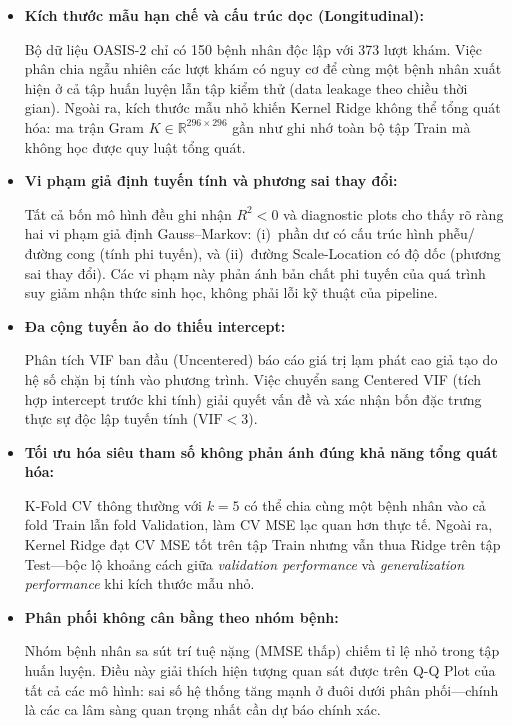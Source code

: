 \begin{itemize}
  \item \textbf{Kích thước mẫu hạn chế và cấu trúc dọc (Longitudinal):}

        Bộ dữ liệu OASIS-2 chỉ có 150 bệnh nhân độc lập với 373 lượt khám.
        Việc phân chia ngẫu nhiên các lượt khám có nguy cơ để cùng một bệnh
        nhân xuất hiện ở cả tập huấn luyện lẫn tập kiểm thử (data leakage
        theo chiều thời gian). Ngoài ra, kích thước mẫu nhỏ khiến Kernel Ridge
        không thể tổng quát hóa: ma trận Gram $K \in \mathbb{R}^{296 \times
        296}$ gần như ghi nhớ toàn bộ tập Train mà không học được quy luật
        tổng quát.
 
  \item \textbf{Vi phạm giả định tuyến tính và phương sai thay đổi:}

        Tất cả bốn mô hình đều ghi nhận $R^2 < 0$ và diagnostic plots cho thấy
        rõ ràng hai vi phạm giả định Gauss--Markov: (i)~phần dư có cấu trúc
        hình phễu/đường cong (tính phi tuyến), và (ii)~đường Scale-Location có
        độ dốc (phương sai thay đổi). Các vi phạm này phản ánh bản chất phi
        tuyến của quá trình suy giảm nhận thức sinh học, không phải lỗi kỹ
        thuật của pipeline.
 
  \item \textbf{Đa cộng tuyến ảo do thiếu intercept:}

        Phân tích VIF ban đầu (Uncentered) báo cáo giá trị lạm phát cao giả tạo
        do hệ số chặn bị tính vào phương trình. Việc chuyển sang Centered VIF
        (tích hợp intercept trước khi tính) giải quyết vấn đề và xác nhận bốn
        đặc trưng thực sự độc lập tuyến tính (\(\text{VIF} < 3\)).
 
  \item \textbf{Tối ưu hóa siêu tham số không phản ánh đúng khả năng tổng
        quát hóa:}

        K-Fold CV thông thường với \(k = 5\) có thể chia cùng một bệnh nhân vào
        cả fold Train lẫn fold Validation, làm CV MSE lạc quan hơn thực tế.
        Ngoài ra, Kernel Ridge đạt CV MSE tốt trên tập Train nhưng vẫn thua
        Ridge trên tập Test—bộc lộ khoảng cách giữa \emph{validation
        performance} và \emph{generalization performance} khi kích thước mẫu
        nhỏ.
 
  \item \textbf{Phân phối không cân bằng theo nhóm bệnh:}

        Nhóm bệnh nhân sa sút trí tuệ nặng (MMSE thấp) chiếm tỉ lệ nhỏ trong
        tập huấn luyện. Điều này giải thích hiện tượng quan sát được trên Q-Q
        Plot của tất cả các mô hình: sai số hệ thống tăng mạnh ở đuôi dưới phân
        phối—chính là các ca lâm sàng quan trọng nhất cần dự báo chính xác.
\end{itemize}

